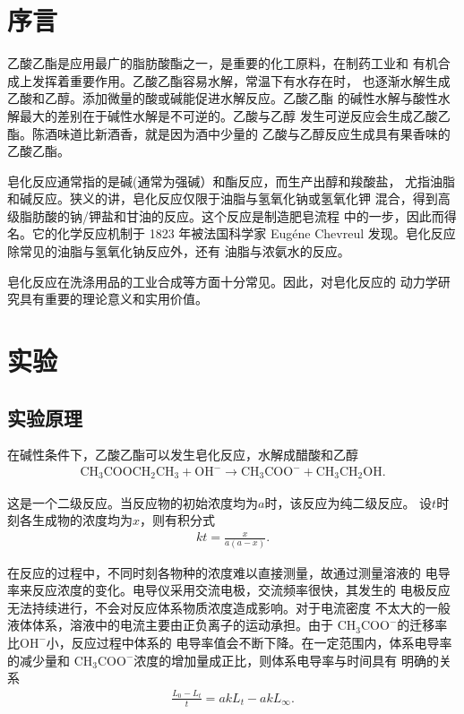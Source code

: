 \documentclass[12pt]{ctexart}
\numberwithin{equation}{section}
\begin{document}
\section{序言}

乙酸乙酯是应用最广的脂肪酸酯之一，是重要的化工原料，在制药工业和
有机合成上发挥着重要作用。乙酸乙酯容易水解，常温下有水存在时，
也逐渐水解生成乙酸和乙醇。添加微量的酸或碱能促进水解反应。乙酸乙酯
的碱性水解与酸性水解最大的差别在于碱性水解是不可逆的。乙酸与乙醇
发生可逆反应会生成乙酸乙酯。陈酒味道比新酒香，就是因为酒中少量的
乙酸与乙醇反应生成具有果香味的乙酸乙酯。

皂化反应通常指的是碱(通常为强碱）和酯反应，而生产出醇和羧酸盐，
尤指油脂和碱反应。狭义的讲，皂化反应仅限于油脂与氢氧化钠或氢氧化钾
混合，得到高级脂肪酸的钠/钾盐和甘油的反应。这个反应是制造肥皂流程
中的一步，因此而得名。它的化学反应机制于 1823 年被法国科学家
Eug\'ene Chevreul 发现。皂化反应除常见的油脂与氢氧化钠反应外，还有
油脂与浓氨水的反应。

皂化反应在洗涤用品的工业合成等方面十分常见。因此，对皂化反应的
动力学研究具有重要的理论意义和实用价值。

\section{实验}
\subsection{实验原理}

在碱性条件下，乙酸乙酯可以发生皂化反应，水解成醋酸和乙醇
\begin{align}
    \mathrm{CH_3COOCH_2CH_3 + OH^- \longrightarrow CH_3COO^- + CH_3CH_2OH}.
\end{align}

这是一个二级反应。当反应物的初始浓度均为$a$时，该反应为纯二级反应。
设$t$时刻各生成物的浓度均为$x$，则有积分式
\begin{align}
    kt = \frac{x}{a(a-x)}.
\end{align}

在反应的过程中，不同时刻各物种的浓度难以直接测量，故通过测量溶液的
电导率来反应浓度的变化。电导仪采用交流电极，交流频率很快，其发生的
电极反应无法持续进行，不会对反应体系物质浓度造成影响。对于电流密度
不太大的一般液体体系，溶液中的电流主要由正负离子的运动承担。由于
$\mathrm{CH_3COO^−}$的迁移率比$\mathrm{OH^−}$小，反应过程中体系的
电导率值会不断下降。在一定范围内，体系电导率的减少量和
$\mathrm{CH_3COO^−}$浓度的增加量成正比，则体系电导率与时间具有
明确的关系
\begin{align}
    \frac{L_0 - L_t}{t} = akL_t - akL_\infty.
\end{align}
\end{document}
